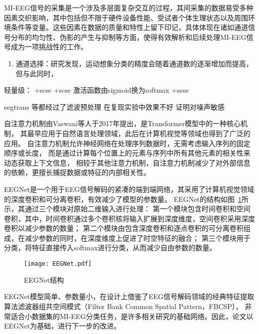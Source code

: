 MI-EEG信号的采集是一个涉及多层面复杂交互的过程，其间采集的数据易受多种因素交织影响，其中包括但不限于硬件设备性能、受试者个体生理状态以及周围环境条件等变量。这些因素在数据的质量和特性上留下印记，具体体现在诸如通道信号分布的均匀性、伪影的产生与抑制等方面，使得有效解析和后续处理MI-EEG信号成为一项挑战性的工作。

\begin{enumerate}
    \item 通道选择：研究发现，运动想象分类的精度会随着通道数的逐渐增加而提高\cite{chang1998annual}，但与此同时，
\end{enumerate}

轻量级：
+scse
+scse 激活函数由sigmoid换为softmax
+sese


eegtrans 等都经过了滤波预处理
在复现实验中效果不好
证明对噪声敏感


自注意力机制由Vaswani等人于2017年提出，是Transformer模型中的一种核心机制\cite{vaswani2017attention}，
    其最早应用于自然语言处理领域，此后在计算机视觉等领域也得到了广泛的应用。
    自注意力机制允许神经网络在处理序列数据时，无需考虑输入序列的固定顺序或长度，
    而是通过计算每个位置上的元素与序列中所有其他元素的相关性来动态获取上下文信息，
    相较于其他注意力机制，自注意力机制减少了对外部信息的依赖，更擅长捕捉数据或特征的内部相关性。


    EEGNet\cite{lawhern2018eegnet}是一个用于EEG信号解码的紧凑的端到端网络，其采用了计算机视觉领域的深度卷积和可分离卷积，有效减少了模型的参数量。
EEGNet的结构如图~\ref{fig:EEGNet}所示，其通过三个模块对原始二维输入进行处理：
第一个模块包含时间卷积和空间卷积，其中，时间卷积通过多个卷积核将输入扩展到深度维度，空间卷积采用深度卷积以减少参数的数量；
第二个模块由包含深度卷积和逐点卷积的可分离卷积组成，在减少参数的同时，在深度维度上促进了时空特征的融合；
第三个模块用于分类，将特征直接传入softmax进行分类，从而减少自由参数的数量。
\begin{figure}
  \centering
  \texttt{[image: EEGNet.pdf]}
  \caption{EEGNet结构}
  \label{fig:EEGNet}
\end{figure}

EEGNet模型简单、参数量小，在设计上借鉴了EEG信号解码领域的经典特征提取算法滤波器组共空间模式（Filter Bank Common Spatial Pattern，FBCSP），
非常适合小数据集的MI-EEG分类任务，是许多相关研究的基础网络。因此，论文以EEGNet为基础，进行下一步的改进。


